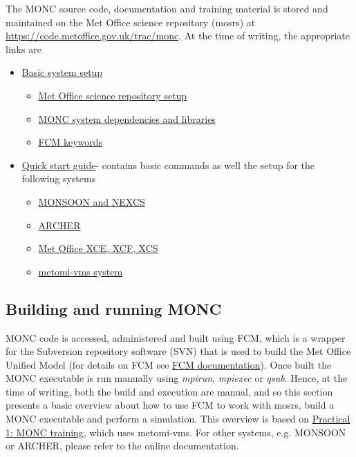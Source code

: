 \documentclass[a4paper,11pt]{article}
\begin{document}
The MONC source code, documentation and training material is stored and maintained
on the Met Office science repository (mosrs) at \url{https://code.metoffice.gov.uk/trac/monc}.
At the time of writing, the appropriate links are
\begin{itemize}
  \item {\href{https://code.metoffice.gov.uk/trac/monc/wiki/MoncDoc/MoncUserguide#BasicSystemsetupforMONC}
  {Basic system setup}}
  \begin{itemize}
    \item {\href{https://code.metoffice.gov.uk/trac/monc/wiki/MoncDoc/MoncUserguide/MosrsSetup}
    {Met Office science repository setup}}
    \item {\href{https://code.metoffice.gov.uk/trac/monc/wiki/MoncDoc/MoncUserguide/MoncDependencies}
    {MONC system dependencies and libraries}}
    \item{\href{https://code.metoffice.gov.uk/trac/monc/wiki/MoncDoc/MoncUserguide/FcmKeyWords}
    {FCM keywords}}
  \end{itemize}
  \item {\href{https://code.metoffice.gov.uk/trac/monc/wiki/MoncDoc/MoncUserguide#QuickstartguideforhowtobuildandrunMONC}
  {Quick start guide}- contains basic commands as well the setup for the following systems}
  \begin{itemize}
    \item  {\href{https://code.metoffice.gov.uk/trac/monc/wiki/MoncDoc/MoncUserguide/MoncOnMonsoon}
    {MONSOON and NEXCS}}
    \item {\href{https://code.metoffice.gov.uk/trac/monc/wiki/MoncDoc/MoncUserguide/MoncOnArcher}
    {ARCHER}}
    \item {\href{https://code.metoffice.gov.uk/trac/monc/wiki/MoncDoc/MoncUserguide/MoncOnMetOfficeCray}
    {Met Office XCE, XCF, XCS}}
    \item {\href{https://code.metoffice.gov.uk/trac/monc/wiki/MoncDoc/MoncUserguide/MoncVms}
    {metomi-vms system}}
  \end{itemize}
\end{itemize}

\subsection{Building and running MONC}

MONC code is accessed, administered and built using FCM, which is a wrapper
for the Subversion repository software (SVN) that is used to build the
Met Office Unified Model (for details on FCM see
\href{http://metomi.github.io/fcm/doc/}{FCM documentation}). Once built the
MONC executable is run manually using \emph{mpirun}, \emph{mpiexec} or
\emph{qsub}. Hence, at the time of writing, both the build and execution are
manual, and so this section presents a basic overview about how to use FCM to
work with mosrs, build a MONC executable and perform a simulation. This overview
is based on \href{https://code.metoffice.gov.uk/trac/monc/wiki/MoncDoc/CoursePracticalOne}
{Practical 1: MONC training}, which uses metomi-vms. For other systems, e.g.
MONSOON or ARCHER, please refer to the online documentation.
\end{document}
